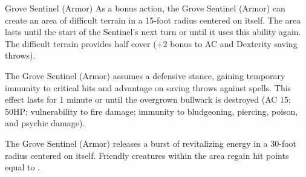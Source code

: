 \documentclass[letterpaper,openany,twoside,twocolumn]{book}
\begin{document}
\begin{DndMonster}[width=0.5\textwidth]{Grove Sentinel (Armor)}
     As a bonus action, the Grove Sentinel (Armor) can create an area of difficult terrain in a 15-foot radius centered on itself. The area lasts until the start of the Sentinel's next turn or until it uses this ability again. The difficult terrain provides half cover (+2 bonus to AC and Dexterity saving throws).
    
	The Grove Sentinel (Armor) assumes a defensive stance, gaining temporary immunity to critical hits and advantage on saving throws against spells. This effect lasts for 1 minute or until the overgrown bullwark is destroyed (AC 15; 50HP; vulnerability to fire damage; immunity to bludgeoning, piercing, poison, and psychic damage).
	
	The Grove Sentinel (Armor) releases a burst of revitalizing energy in a 30-foot radius centered on itself. Friendly creatures within the area regain hit points equal to .
      
\end{DndMonster}

\vfill\eject %
\end{document}
